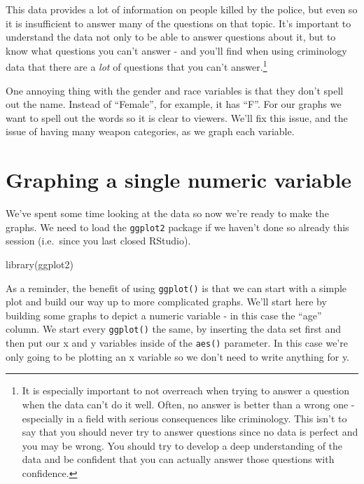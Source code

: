 \documentclass[
]{krantz}
\makeatletter
\newenvironment{Shaded}{\begin{snugshade}}{\end{snugshade}}
\newcommand{\FunctionTok}[1]{\textcolor[rgb]{0,0,0}{#1}}
\newcommand{\NormalTok}[1]{#1}
\newenvironment{kframe}{%
\medskip{}
\setlength{\fboxsep}{.8em}
 \def\at@end@of@kframe{}%
 \ifinner\ifhmode%
  \def\at@end@of@kframe{\end{minipage}}%
  \begin{minipage}{\columnwidth}%
 \fi\fi%
 \def\FrameCommand##1{\hskip\@totalleftmargin \hskip-\fboxsep
 \colorbox{shadecolor}{##1}\hskip-\fboxsep
     \hskip-\linewidth \hskip-\@totalleftmargin \hskip\columnwidth}%
 \MakeFramed {\advance\hsize-\width
   \@totalleftmargin\z@ \linewidth\hsize
   \@setminipage}}%
 {\par\unskip\endMakeFramed%
 \at@end@of@kframe}
\renewenvironment{Shaded}{\begin{kframe}}{\end{kframe}}
\makeatother
\begin{document}
This data provides a lot of information on people killed by
the police, but even so it is insufficient to answer many of
the questions on that topic. It's important to understand
the data not only to be able to answer questions about it,
but to know what questions you can't answer - and you'll
find when using criminology data that there are a \emph{lot}
of questions that you can't answer.\footnote{It is
  especially important to not overreach when trying to
  answer a question when the data can't do it well. Often,
  no answer is better than a wrong one - especially in a
  field with serious consequences like criminology. This
  isn't to say that you should never try to answer questions
  since no data is perfect and you may be wrong. You should
  try to develop a deep understanding of the data and be
  confident that you can actually answer those questions
  with confidence.}

One annoying thing with the gender and race variables is
that they don't spell out the name. Instead of ``Female'',
for example, it has ``F''. For our graphs we want to spell
out the words so it is clear to viewers. We'll fix this
issue, and the issue of having many weapon categories, as we
graph each variable.

\hypertarget{graphing-a-single-numeric-variable}{%
\section{Graphing a single numeric
variable}\label{graphing-a-single-numeric-variable}}

We've spent some time looking at the data so now we're ready
to make the graphs. We need to load the \texttt{ggplot2}
package if we haven't done so already this session
(i.e.~since you last closed RStudio).

\begin{Shaded}
\begin{Highlighting}[]
\FunctionTok{library}\NormalTok{(ggplot2)}
\end{Highlighting}
\end{Shaded}

As a reminder, the benefit of using \texttt{ggplot()} is
that we can start with a simple plot and build our way up to
more complicated graphs. We'll start here by building some
graphs to depict a numeric variable - in this case the
``age'' column. We start every \texttt{ggplot()} the same,
by inserting the data set first and then put our x and y
variables inside of the \texttt{aes()} parameter. In this
case we're only going to be plotting an x variable so we
don't need to write anything for y.
\end{document}
